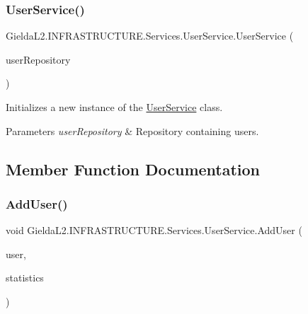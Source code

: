 \subsubsection{\texorpdfstring{UserService()}{UserService()}}
{\footnotesize\ttfamily Gielda\+L2.\+I\+N\+F\+R\+A\+S\+T\+R\+U\+C\+T\+U\+R\+E.\+Services.\+User\+Service.\+User\+Service (\begin{DoxyParamCaption}\item[{\mbox{\hyperlink{interface_gielda_l2_1_1_d_b_1_1_interfaces_1_1_i_user_repository}{I\+User\+Repository}}}]{user\+Repository }\end{DoxyParamCaption})}



Initializes a new instance of the \mbox{\hyperlink{class_gielda_l2_1_1_i_n_f_r_a_s_t_r_u_c_t_u_r_e_1_1_services_1_1_user_service}{User\+Service}} class. 


\begin{DoxyParams}{Parameters}
{\em user\+Repository} & Repository containing users.\\
\hline
\end{DoxyParams}


\subsection{Member Function Documentation}
\mbox{\label{class_gielda_l2_1_1_i_n_f_r_a_s_t_r_u_c_t_u_r_e_1_1_services_1_1_user_service_a0758f1bb59fe3430fc4122347e82bccf}} 
\subsubsection{\texorpdfstring{AddUser()}{AddUser()}}
{\footnotesize\ttfamily void Gielda\+L2.\+I\+N\+F\+R\+A\+S\+T\+R\+U\+C\+T\+U\+R\+E.\+Services.\+User\+Service.\+Add\+User (\begin{DoxyParamCaption}\item[{\mbox{\hyperlink{class_gielda_l2_1_1_i_n_f_r_a_s_t_r_u_c_t_u_r_e_1_1_d_t_o_1_1_user_d_t_o}{User\+D\+TO}}}]{user,  }\item[{\mbox{\hyperlink{class_gielda_l2_1_1_i_n_f_r_a_s_t_r_u_c_t_u_r_e_1_1_d_t_o_1_1_statistics_d_t_o}{Statistics\+D\+TO}}}]{statistics }\end{DoxyParamCaption})}



